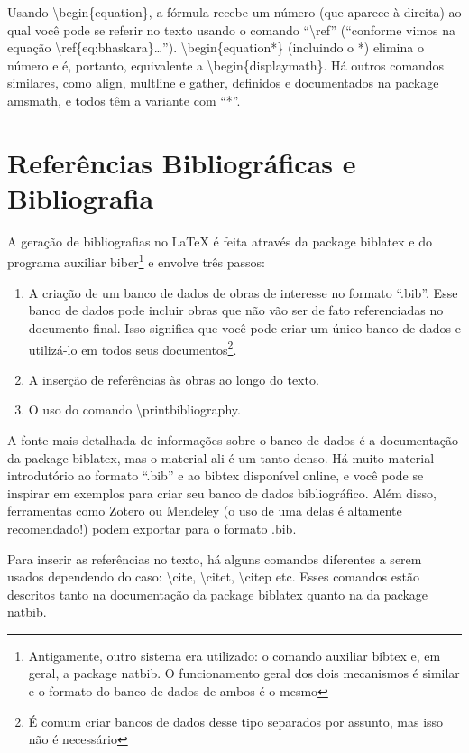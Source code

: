 Usando \textsf{\textbackslash{}begin\{equation\}}, a fórmula recebe um
número (que aparece à direita) ao qual você pode se referir no texto
usando o comando ``\textsf{\textbackslash{}ref}'' (``conforme vimos na
equação \textbackslash{}ref\{eq:bhaskara\}\ldots'').
\textsf{\textbackslash{}begin\{equation*\}} (incluindo o *) elimina
o número e é, portanto, equivalente a
\textsf{\textbackslash{}begin\{displaymath\}}. Há outros comandos
similares, como \textsf{align}, \textsf{multline} e \textsf{gather},
definidos e documentados na package \textsf{amsmath}, e todos têm
a variante com ``*''.

\section{Referências Bibliográficas e Bibliografia}

A geração de bibliografias no \LaTeX{} é feita através da package biblatex
e do programa auxiliar biber\footnote{Antigamente, outro sistema era utilizado:
o comando auxiliar bibtex e, em geral, a package natbib. O funcionamento
geral dos dois mecanismos é similar e o formato do banco de dados de ambos
é o mesmo} e envolve três passos:

\begin{enumerate}
\item A criação de um banco de dados de obras de interesse no formato
``.bib''. Esse banco de dados pode incluir obras que não vão ser de fato
referenciadas no documento final. Isso significa que você pode criar um
único banco de dados e utilizá-lo em todos seus documentos\footnote{É
comum criar bancos de dados desse tipo separados por assunto, mas isso
não é necessário}.

\item A inserção de referências às obras ao longo do texto.

\item O uso do comando \textsf{\textbackslash{}printbibliography}.
\end{enumerate}

A fonte mais detalhada de informações sobre o banco de dados é a
documentação da package biblatex, mas o material ali é um tanto denso.
Há muito material introdutório ao formato ``.bib'' e ao bibtex disponível
online, e você pode se inspirar em exemplos para criar seu banco de dados
bibliográfico. Além disso, ferramentas como Zotero ou Mendeley (o uso de
uma delas é altamente recomendado!) podem exportar para o formato .bib.

Para inserir as referências no texto, há alguns comandos diferentes a
serem usados dependendo do caso:
\textsf{\textbackslash{}cite},
\textsf{\textbackslash{}citet},
\textsf{\textbackslash{}citep} etc. Esses comandos estão descritos tanto
na documentação da package biblatex quanto na da package natbib.

